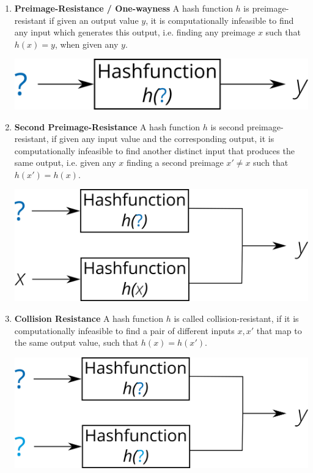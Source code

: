 \begin{enumerate} %
	\item \textbf{Preimage-Resistance / One-wayness}
	 A hash function $h$ is preimage-resistant if given an output value $y$, it is computationally infeasible to find any input which generates this output, i.e. finding any preimage $x$ such that $h(x) = y $, when given any $y$. 

\begin{minipage}[t]{.5\linewidth}
          	\raggedright
            \includegraphics[width=.8\linewidth]{images/Background/preimage_res_horizontal.png}
	      \end{minipage} 

	\item \textbf{Second Preimage-Resistance}
	A hash function $h$ is second preimage-resistant, if given any input value and the corresponding output, it is computationally infeasible to find another distinct
input that produces the same output, i.e. given any $x$ finding a second preimage $x' \neq x$ such that $h(x') = h(x)$. 

\begin{minipage}[t]{.6\linewidth}
          	\raggedright
            \includegraphics[width=.8\linewidth]{images/Background/second_preimage_res_horizontal.png}
	      \end{minipage} 
	
	\item \textbf{Collision Resistance}
	A hash function $h$ is called collision-resistant, if it is computationally infeasible to find a pair of different inputs $x, x'$ that map to the same output value, such that $h(x) = h(x')$.


\begin{minipage}[t]{.6\linewidth}
          	\raggedright
            \includegraphics[width=.8\linewidth]{images/Background/collission_res_horizontal.png}
	      \end{minipage}
	      
\end{enumerate}	      


